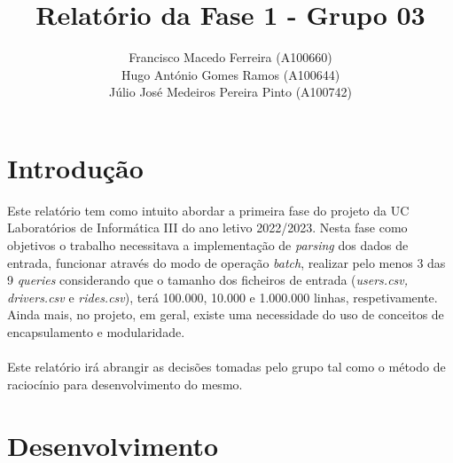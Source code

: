 \documentclass{article}
\title{Relatório da Fase 1 - Grupo 03}
\author{Francisco Macedo Ferreira (A100660)\\Hugo António Gomes Ramos (A100644)\\Júlio José Medeiros Pereira Pinto (A100742)}
\begin{document}
    \maketitle

    \section{Introdução}

    Este relatório tem como intuito abordar a primeira fase do projeto da UC Laboratórios 
    de Informática III do ano letivo 2022/2023.
    Nesta fase como objetivos o trabalho necessitava a implementação de \emph{parsing} dos
    dados de entrada, funcionar através do modo de operação \emph{batch}, 
    realizar pelo menos 3 das 9 \emph{queries} considerando que o 
    tamanho dos ficheiros de entrada 
    (\emph{users.csv, drivers.csv} e \emph{rides.csv}), terá 100.000, 10.000 e 
    1.000.000 linhas, respetivamente. Ainda mais, no projeto, em geral, existe 
    uma necessidade do uso de conceitos de encapsulamento e modularidade.
    \\
    \\Este relatório irá abrangir as decisões tomadas pelo grupo tal como o método de raciocínio para desenvolvimento do mesmo.
    
    \section{Desenvolvimento}
\end{document}
